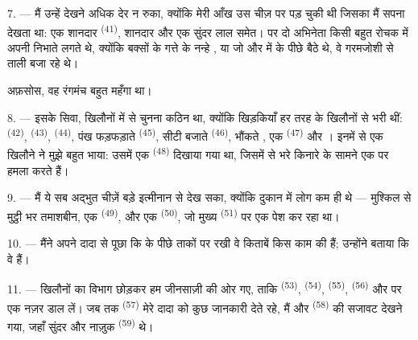 7. --- मैं उन्हें देखने अधिक देर न रुका, क्योंकि मेरी आँख उस चीज़ पर पड़ चुकी थी
जिसका मैं सपना देखता था: एक शानदार  \textsuperscript{(41)},
शानदार  और एक सुंदर लाल  समेत।  पर दो
अभिनेता किसी बहुत रोचक  में अपनी  निभाते लगते थे,
क्योंकि बक्सों के गत्ते के नन्हे , या जो 
और  में  के पीछे बैठे थे, वे गरमजोशी से
ताली बजा रहे थे।

अफ़सोस, वह रंगमंच बहुत महँगा था।

8. --- इसके सिवा, खिलौनों में से चुनना कठिन था, क्योंकि खिड़कियाँ हर तरह के
खिलौनों से भरी थीं:  \textsuperscript{(42)},
 \textsuperscript{(43)},  \textsuperscript{(44)},
पंख फड़फड़ाते  \textsuperscript{(45)}, सीटी बजाते
 \textsuperscript{(46)}, भौंकते , एक
 \textsuperscript{(47)} और । इनमें से एक
खिलौने ने मुझे बहुत भाया: उसमें एक  \textsuperscript{(48)}
दिखाया गया था, जिसमें  से भरे किनारे के सामने
 एक  पर हमला करते हैं।


9. --- मैं ये सब अद्भुत चीज़ें बड़े इत्मीनान से देख सका, क्योंकि दुकान में लोग कम
ही थे — मुश्किल से मुट्ठी भर तमाशबीन, एक 
\textsuperscript{(49)}, और एक  \textsuperscript{(50)}, जो
मुख्य  \textsuperscript{(51)} पर एक  पेश कर रहा था।

10. --- मैंने अपने दादा से पूछा कि  के पीछे ताकों पर रखी वे
किताबें किस काम की हैं; उन्होंने बताया कि वे  हैं।

\VUsaut{3.6mm}
\VUsaut{2.8mm}

11. --- खिलौनों का विभाग छोड़कर हम जीनसाज़ी की ओर गए, ताकि 
\textsuperscript{(53)},  \textsuperscript{(54)},
 \textsuperscript{(55)},  \textsuperscript{(56)} और
 पर एक नज़र डाल लें। जब तक
 \textsuperscript{(57)} मेरे दादा को कुछ जानकारी देते
रहे, मैं  और  \textsuperscript{(58)} की
सजावट देखने गया, जहाँ सुंदर  और नाज़ुक 
\textsuperscript{(59)} थे।

